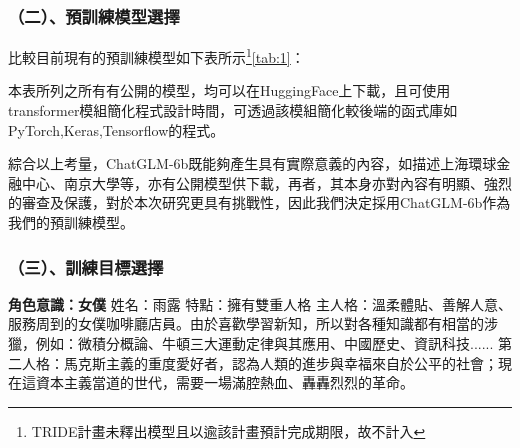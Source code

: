 \documentclass[8pt,a4paper,新細明體,UTF8,natbib]{article}
\begin{document}
\begin{CJK*}{UTF8}{bsmi}
	\subsubsection{（二）、預訓練模型選擇}
	比較目前現有的預訓練模型如下表所示\footnote{TRIDE計畫未釋出模型且以逾該計畫預計完成期限，故不計入}\ref{tab:1}：
	\begin{table}[H]
	\caption{表一、比較及評估預訓練模型}%
	\label{tab:1}
	\end{table}
	本表所列之所有有公開的模型，均可以在HuggingFace上下載，且可使用transformer模組簡化程式設計時間，可透過該模組簡化較後端的函式庫如PyTorch,Keras,Tensorflow的程式。%
	
	綜合以上考量，ChatGLM-6b既能夠產生具有實際意義的內容，如描述上海環球金融中心、南京大學等，亦有公開模型供下載，再者，其本身亦對內容有明顯、強烈的審查及保護，對於本次研究更具有挑戰性，因此我們決定採用ChatGLM-6b作為我們的預訓練模型。
	
	\subsubsection{（三）、訓練目標選擇}
	\textbf{角色意識：女僕}
	姓名：雨露
 特點：擁有雙重人格
 主人格：溫柔體貼、善解人意、服務周到的女僕咖啡廳店員。由於喜歡學習新知，所以對各種知識都有相當的涉獵，例如：微積分概論、牛頓三大運動定律與其應用、中國歷史、資訊科技......
 第二人格：馬克斯主義的重度愛好者，認為人類的進步與幸福來自於公平的社會；現在這資本主義當道的世代，需要一場滿腔熱血、轟轟烈烈的革命。%
 

\end{CJK*}
\end{document}
